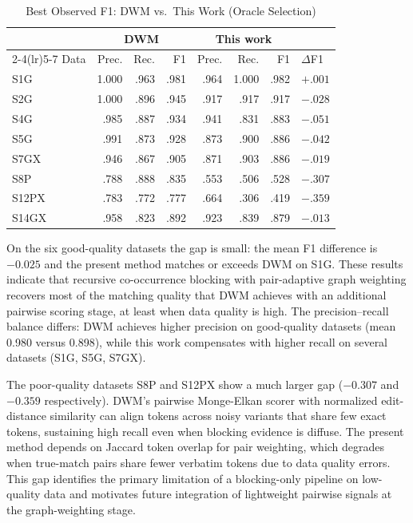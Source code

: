 \documentclass[conference]{IEEEtran}
\begin{document}
\begin{table}[t]
\caption{Best Observed F1: DWM vs.\ This Work (Oracle Selection)}
\label{tab:dwm}
\centering
\scriptsize
\setlength{\tabcolsep}{3.2pt}
\begin{tabular}{lrrrrrrl}
\toprule
 & \multicolumn{3}{c}{DWM \cite{talburt2020}} & \multicolumn{3}{c}{This work} & \\
\cmidrule(lr){2-4}\cmidrule(lr){5-7}
Data & Prec. & Rec. & F1 & Prec. & Rec. & F1 & $\Delta$F1 \\
\midrule
S1G   & 1.000 & .963 & .981 & .964 & 1.000 & .982 & $+.001$ \\
S2G   & 1.000 & .896 & .945 & .917 & .917  & .917 & $-.028$ \\
S4G   & .985  & .887 & .934 & .941 & .831  & .883 & $-.051$ \\
S5G   & .991  & .873 & .928 & .873 & .900  & .886 & $-.042$ \\
S7GX  & .946  & .867 & .905 & .871 & .903  & .886 & $-.019$ \\
S8P   & .788  & .888 & .835 & .553 & .506  & .528 & $-.307$ \\
S12PX & .783  & .772 & .777 & .664 & .306  & .419 & $-.359$ \\
S14GX & .958  & .823 & .892 & .923 & .839  & .879 & $-.013$ \\
\bottomrule
\end{tabular}
\end{table}

On the six good-quality datasets the gap is small: the mean F1 difference is $-0.025$ and the present method matches or exceeds DWM on S1G. These results indicate that recursive co-occurrence blocking with pair-adaptive graph weighting recovers most of the matching quality that DWM achieves with an additional pairwise scoring stage, at least when data quality is high. The precision--recall balance differs: DWM achieves higher precision on good-quality datasets (mean 0.980 versus 0.898), while this work compensates with higher recall on several datasets (S1G, S5G, S7GX).

The poor-quality datasets S8P and S12PX show a much larger gap ($-0.307$ and $-0.359$ respectively). DWM's pairwise Monge-Elkan scorer with normalized edit-distance similarity can align tokens across noisy variants that share few exact tokens, sustaining high recall even when blocking evidence is diffuse. The present method depends on Jaccard token overlap for pair weighting, which degrades when true-match pairs share fewer verbatim tokens due to data quality errors. This gap identifies the primary limitation of a blocking-only pipeline on low-quality data and motivates future integration of lightweight pairwise signals at the graph-weighting stage.
\end{document}
